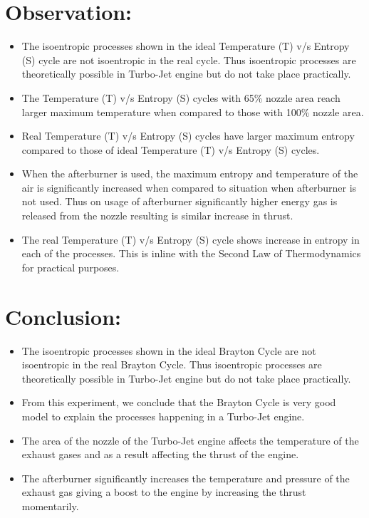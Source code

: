 \documentclass[12pt,a4paper]{article}
\begin{document}
\section{Observation:}
\begin{itemize}
\item The isoentropic processes shown in the ideal Temperature (T) v/s Entropy (S) cycle are not isoentropic in the real cycle. Thus isoentropic processes are theoretically possible in Turbo-Jet engine but do not take place practically.
\item The Temperature (T) v/s Entropy (S) cycles with 65\% nozzle area reach larger maximum temperature when compared to those with 100\% nozzle area.
\item Real Temperature (T) v/s Entropy (S) cycles have larger maximum entropy compared to those of ideal Temperature (T) v/s Entropy (S) cycles.
\item When the afterburner is used, the maximum entropy and temperature of the air is significantly increased when compared to situation when afterburner is not used. Thus on usage of afterburner significantly higher energy gas is released from the nozzle resulting is similar increase in thrust.
\item The real Temperature (T) v/s Entropy (S) cycle shows increase in entropy in each of the processes. This is inline with the Second Law of Thermodynamics for practical purposes.
\end{itemize}
\section{Conclusion:}
\begin{itemize}
\item The isoentropic processes shown in the ideal Brayton Cycle are not isoentropic in the real Brayton Cycle. Thus isoentropic processes are theoretically possible in Turbo-Jet engine but do not take place practically.
\item From this experiment, we conclude that the Brayton Cycle is very good model to explain the processes happening in a Turbo-Jet engine.
\item The area of the nozzle of the Turbo-Jet engine affects the temperature of the exhaust gases and as a result affecting the thrust of the engine.
\item The afterburner significantly increases the temperature and pressure of the exhaust gas giving a boost to the engine by increasing the thrust momentarily.
\end{itemize}
\end{document}
